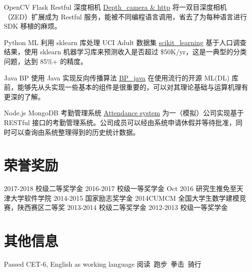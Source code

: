 \documentclass[utf8]{twentysecondcv} %
\begin{document}
\begin{twenty}
		\twentyitem
        {OpenCV}
        {Flask}
        {Restful 深度相机}
        {\href{https://github.com/MiaoDX/depth\_camera}{Depth\_camera \& http}}
        {}
        {将一双目深度相机（ZED）扩展成为 Restful 服务，能被不同编程语言调用，省去了为每种语言进行 SDK 移植的麻烦。}

	    \twentyitem
        {Python}
		{ML}
        {利用 sklearn 库处理 UCI Adult 数据集}
        {\href{https://github.com/MiaoDX/scikit\_learning/}{scikit\_learning}}
        {}
		{基于人口调查结果，使用 sklearn 机器学习库来预测收入是否超过 \$50K/yr，这是一典型的分类问题，达到 85\%+ 的精度。}
		
        \twentyitem
        {Java}
       	{BP}
        {使用 Java 实现反向传播算法}
        {\href{https://github.com/MiaoDX/bp_java}{BP\_java}}
        {}                
        {在使用流行的开源 ML(\/DL) 库前，能够先从头实现一些基本的组件是很重要的，可以对其理论基础与运算机理有更深的了解。}
		
		\twentyitem
        {Node.js}
        {MongoDB}
        {考勤管理系统}
        {\href{https://github.com/SEAPC2016/attendance}{Attendance system}}
        {}
        {为一（模拟）公司实现基于 RESTful 接口的考勤管理系统。公司成员可以经由系统申请休假并等待批准，同时可以查询由系统整理得到的历史统计数据。}

\end{twenty}

\section{荣誉奖励}

\begin{twentyshort}
    \twentyitemshort
        {2017-2018}
        {校级二等奖学金}
	\twentyitemshort
        {2016-2017}
        {校级一等奖学金}
	\twentyitemshort
		{Oct 2016}        
		{研究生推免至天津大学软件学院}
	\twentyitemshort
		{2014-2015}
		{国家励志奖学金}
	\twentyitemshort
		{2014CUMCM}
		{全国大学生数学建模竞赛，陕西赛区二等奖}
	\twentyitemshort
		{2013-2014}
		{校级二等奖学金}		
	\twentyitemshort
		{2012-2013}
		{校级一等奖学金}		
\end{twentyshort}        


\section{其他信息}


\begin{twentyshort}
    \twentyitemshort
        {Passed CET-6, English as working language}
        {}
	\twentyitemshort
        {阅读\ 跑步\ 拳击\ 骑行}
        {}
\end{twentyshort}        
\end{document}
